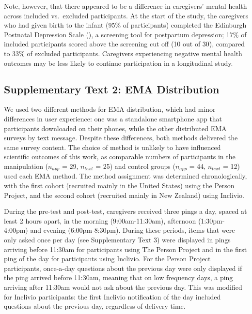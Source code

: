 \documentclass[
]{article}
\begin{document}
Note, however, that there appeared to be a difference in caregivers'
mental health across included vs.~excluded participants. At the start of
the study, the caregivers who had given birth to the infant (95\% of
participants) completed the Edinburgh Postnatal Depression Scale
(), a screening tool for
postpartum depression; 17\% of included participants scored above the
screening cut off (10 out of 30), compared to 33\% of excluded
participants. Caregivers experiencing negative mental health outcomes
may be less likely to continue participation in a longitudinal study.

\subsection*{Supplementary Text 2: EMA
Distribution}\label{supplementary-text-2-ema-distribution}

We used two different methods for EMA distribution, which had minor
differences in user experience: one was a standalone smartphone app that
participants downloaded on their phones, while the other distributed EMA
surveys by text message. Despite these differences, both methods
delivered the same survey content. The choice of method is unlikely to
have influenced scientific outcomes of this work, as comparable numbers
of participants in the manipulation (\(n_{app}\) = 29, \(n_{text}\) =
25) and control groups (\(n_{app}\) = 44, \(n_{text}\) = 12) used each
EMA method. The method assignment was determined chronologically, with
the first cohort (recruited mainly in the United States) using the
Person Project, and the second cohort (recruited mainly in New Zealand)
using Inclivio.

During the pre-test and post-test, caregivers received three pings a
day, spaced at least 2 hours apart, in the morning (9:00am-11:30am),
afternoon (1:30pm-4:00pm) and evening (6:00pm-8:30pm). During these
periods, items that were only asked once per day (see Supplementary Text
3) were displayed in pings arriving before 11:30am for participants
using The Person Project and in the first ping of the day for
participants using Inclivio. For the Person Project participants,
once-a-day questions about the previous day were only displayed if the
ping arrived before 11:30am, meaning that on low frequency days, a ping
arriving after 11:30am would not ask about the previous day. This was
modified for Inclivio participants: the first Inclivio notification of
the day included questions about the previous day, regardless of
delivery time.
\end{document}
